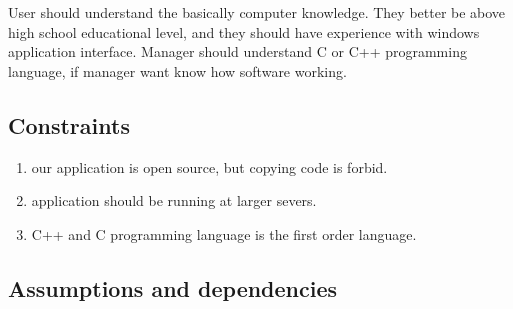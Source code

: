 User should understand the basically computer knowledge.
They better be above high school educational level, 
and they should have experience with windows application interface.
Manager should understand C or C++ programming language, if manager want know how software working.

\subsection{Constraints}
% 

\begin{enumerate}
  \item our application is open source, but copying code is forbid.
  \item application should be running at larger severs.
  \item C++ and C programming language is the first order language.
\end{enumerate}

\subsection{Assumptions and dependencies}

